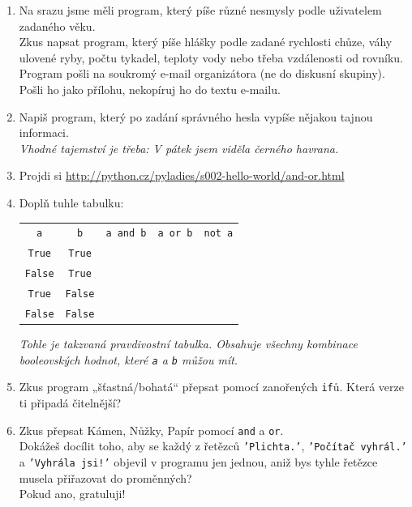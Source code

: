 \documentclass[a4paper,10pt]{article}
\newcommand\True{\texttt{True}}
\newcommand\False{\texttt{False}}
\begin{document}
\begin{enumerate}[resume]

\item Na srazu jsme měli program, který píše různé nesmysly podle uživatelem zadaného věku.
    \\Zkus napsat program, který píše hlášky podle zadané
    rychlosti chůze, váhy ulovené ryby, počtu tykadel, teploty vody
    nebo třeba vzdálenosti od rovníku.
    \\Program pošli na soukromý e-mail organizátora (ne do diskusní skupiny).
    Pošli ho jako přílohu, nekopíruj ho do textu e-mailu.

\item Napiš program, který po zadání správného hesla vypíše nějakou tajnou informaci.
    \\\emph{\small Vhodné tajemství je třeba: V pátek jsem viděla černého havrana.}

\item Projdi si \url{http://python.cz/pyladies/s002-hello-world/and-or.html}

\item Doplň tuhle tabulku:

    {
        \newcommand\rowend{\rule{0pt}{0.5cm}\\ \hline}
        \begin{tabular}{c|c|c|c|c}
        \arrayrulecolor{silver}
        \verb+a+ & \verb+b+ & \verb+a and b+ & \verb+a or b+ & \verb+not a+ \\
        \arrayrulecolor{black}\hline\arrayrulecolor{silver}
        \True & \True &  &  &  \rowend
        \False & \True &  &  &  \rowend
        \True & \False &  &  &  \rowend
        \False & \False &  &  &  \rowend
        \end{tabular}
    }

    \emph{\small Tohle je takzvaná \emph{pravdivostní tabulka}.
          Obsahuje všechny kombinace booleovských hodnot, které \texttt{a} a \texttt{b}
          můžou mít.}

\item Zkus program „šťastná/bohatá“ přepsat pomocí zanořených \texttt{if}ů. Která verze ti připadá čitelnější?

\item Zkus přepsat Kámen, Nůžky, Papír pomocí \texttt{and} a \texttt{or}.
    \\Dokážeš docílit toho, aby se každý z řetězců \texttt{'Plichta.'},
    \texttt{'Počítač vyhrál.'} a \texttt{'Vyhrála jsi!'} objevil v programu jen jednou,
    aniž bys tyhle řetězce musela přiřazovat do proměnných?
    \\Pokud ano, gratuluji!

\end{enumerate}
\end{document}
